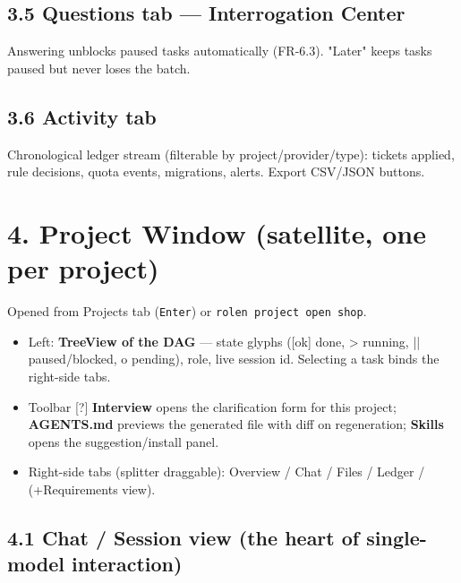 \documentclass[10pt,a4paper]{article}
\begin{document}
\subsection{3.5 Questions tab — Interrogation Center}
\begin{center}

\end{center}

Answering unblocks paused tasks automatically (FR-6.3). "Later" keeps tasks paused but never loses the batch.

\subsection{3.6 Activity tab}
Chronological ledger stream (filterable by project/provider/type): tickets applied, rule decisions, quota events, migrations, alerts. Export CSV/JSON buttons.

\section{4. Project Window (satellite, one per project)}
Opened from Projects tab (\texttt{Enter}) or \texttt{rolen project open shop}.

\begin{center}

\end{center}

\begin{itemize}
  \item Left: \textbf{TreeView of the DAG} — state glyphs ([ok] done, > running, || paused/blocked,
o pending), role, live session id. Selecting a task binds the right-side tabs.

  \item Toolbar [?] \textbf{Interview} opens the clarification form for this project; \textbf{AGENTS.md}
previews the generated file with diff on regeneration; \textbf{Skills} opens the suggestion/install panel.

  \item Right-side tabs (splitter draggable): Overview / Chat / Files / Ledger / (+Requirements view).
\end{itemize}
\subsection{4.1 Chat / Session view (the heart of single-model interaction)}
\begin{center}

\end{center}
\end{document}
